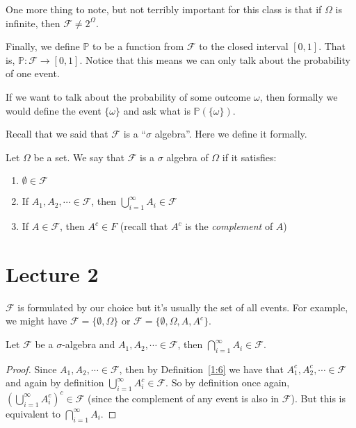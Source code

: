 \documentclass[notitlepage,abstract=on,twoside=semi]{scrartcl}
\newcommand{\om}{\ensuremath{\Omega}}
\newcommand{\F}{\ensuremath{\mathcal{F}}}
\newcommand{\Prob}{\ensuremath{\mathbb{P}}}
\begin{document}
One more thing to note, but not terribly important for this class is that if
$\om$ is infinite, then $\F \neq 2^{\om}$.

Finally, we define $\Prob$ to be a function from $\F$ to the closed interval
$[0, 1]$. That is, $\Prob : \F \to [0, 1]$. Notice that this means we can only
talk about the probability of one event.

If we want to talk about the probability of some outcome $\omega$, then
 formally we would define the event $\{\omega\}$ and ask what is
$\Prob(\{\omega\})$.

Recall that we said that $\F$ is a ``$\sigma$ algebra''. Here we define it
formally.
\begin{definition}
  \label{1:6}
  Let $\om$ be a set. We say that $\F$ is a $\sigma$ algebra of $\om$ if it
  satisfies:
  \begin{enumerate}
  \item $\emptyset \in \F$
  \item If $A_{1}, A_{2}, \cdots \in \F$, then $\bigcup_{i=1}^{\infty} A_{i}
    \in \F$
  \item If $A \in \F$, then $A^{c} \in F$ (recall that $A^{c}$ is the
    \textit{complement} of $A$)
  \end{enumerate}
\end{definition}

\newpage

\section{Lecture 2}
\label{lec2}
\begin{remark}
  \label{2:1}
  $\F$ is formulated by our choice but it's usually the set of all events. For
  example, we might have $\F = \{\emptyset, \Omega\}$ or $\F = \{\emptyset,
  \Omega, A, A^{c}\}$.
\end{remark}

\begin{proposition}
  \label{2:2}
  Let $\F$ be a $\sigma$-algebra and $A_{1}, A_{2}, \cdots \in \F$, then
  $\bigcap_{i=1}^{\infty} A_{i} \in \F$.
\end{proposition}
\begin{proof}
  Since $A_{1}, A_{2}, \cdots \in \F$, then by Definition~\ref{1:6} we have
  that $A_{1}^{c}, A_{2}^{c}, \cdots \in \F$ and again by definition
  $\bigcup_{i=1}^{\infty} A_{i}^{c} \in \F$. So by definition once again,
  $(\bigcup_{i=1}^{\infty} A_{i}^{c})^{c} \in \F$ (since the complement of any
  event is also in $\F$). But this is equivalent to $\bigcap_{i=1}^{\infty}
  A_{i}$.
\end{proof}
\end{document}
